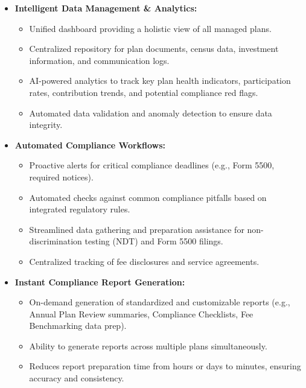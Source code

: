 \documentclass[11pt]{article} %
\begin{document}
\begin{itemize}[leftmargin=*]
    \item \textbf{Intelligent Data Management & Analytics:} 
        \begin{itemize}[label=\textbullet, leftmargin=*]
            \item Unified dashboard providing a holistic view of all managed plans.
            \item Centralized repository for plan documents, census data, investment information, and communication logs.
            \item AI-powered analytics to track key plan health indicators, participation rates, contribution trends, and potential compliance red flags.
            \item Automated data validation and anomaly detection to ensure data integrity.
        \end{itemize}
    \item \textbf{Automated Compliance Workflows:} 
        \begin{itemize}[label=\textbullet, leftmargin=*]
            \item Proactive alerts for critical compliance deadlines (e.g., Form 5500, required notices).
            \item Automated checks against common compliance pitfalls based on integrated regulatory rules.
            \item Streamlined data gathering and preparation assistance for non-discrimination testing (NDT) and Form 5500 filings.
            \item Centralized tracking of fee disclosures and service agreements.
        \end{itemize}
    \item \textbf{Instant Compliance Report Generation:} 
        \begin{itemize}[label=\textbullet, leftmargin=*]
            \item On-demand generation of standardized and customizable reports (e.g., Annual Plan Review summaries, Compliance Checklists, Fee Benchmarking data prep).
            \item Ability to generate reports across multiple plans simultaneously.
            \item Reduces report preparation time from hours or days to minutes, ensuring accuracy and consistency.
        \end{itemize}
\end{itemize}
\end{document}
